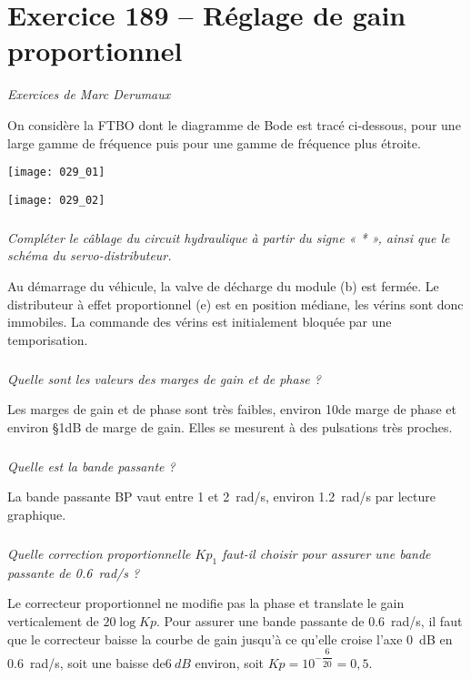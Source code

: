 \section*{Exercice 189 -- Réglage de gain proportionnel}
\setcounter{exo}{0}

\textit{Exercices de Marc Derumaux}

On considère la FTBO dont le diagramme de Bode est tracé ci-dessous, pour une large
gamme de fréquence puis pour une gamme de fréquence plus étroite.



\begin{center}
\texttt{[image: 029\_01]}
\end{center}


\begin{center}
\texttt{[image: 029\_02]}
\end{center}


\subparagraph{}\textit{Compléter le câblage du circuit hydraulique à partir du signe « * », ainsi que le schéma du servo-distributeur.}
\ifprof
\begin{corrige}
\end{corrige}
\else
\fi

Au démarrage du véhicule, la valve de décharge du module (b) est fermée. Le distributeur à effet proportionnel (e) est en position médiane, les vérins sont donc immobiles. La commande des vérins est initialement bloquée par une temporisation.

\subparagraph{}\textit{Quelle sont les valeurs des marges de gain et de phase ? }
\ifprof
\begin{corrige}
Les marges de gain et de phase sont très faibles, environ 10\degres de marge de phase et
environ \S{1}{dB} de marge de gain. Elles se
mesurent à des pulsations très proches.
\end{corrige}
\else
\fi


\subparagraph{}\textit{Quelle est la bande passante ?}
\ifprof
\begin{corrige}
La bande passante BP vaut entre 1 et \SI{2}{rad/s},
environ \SI{1,2}{rad/s} par lecture graphique.
\end{corrige}
\else
\fi

\subparagraph{}\textit{Quelle correction proportionnelle $Kp_1$ faut-il choisir pour assurer une bande passante de \SI{0,6}{rad/s} ?}
\ifprof
\begin{corrige}
Le correcteur proportionnel ne modifie pas la phase et translate le gain verticalement de
$20 \log Kp$. Pour assurer une bande passante de \SI{0,6}{rad/s}, il faut que le correcteur baisse la
courbe de gain jusqu'à ce qu'elle croise l'axe \SI{0}{dB} en \SI{0,6}{rad/s}, soit une baisse de$\SI{6}{dB}$
environ, soit $Kp=10^{-\dfrac{6}{20}}=0,5$.
\end{corrige}
\else
\fi

